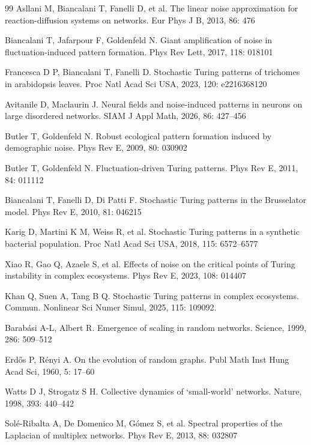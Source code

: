 \documentclass{SCIS2026}
\begin{document}
\begin{thebibliography}{99}
	Asllani M, Biancalani T, Fanelli D, et al. The linear noise approximation for reaction-diffusion systems on networks. Eur Phys J B, 2013, 86: 476

	Biancalani T, Jafarpour F, Goldenfeld N. Giant amplification of noise in fluctuation-induced pattern formation. Phys Rev Lett, 2017, 118: 018101

	Francesca D P, Biancalani T, Fanelli D. Stochastic Turing patterns of trichomes in arabidopsis leaves. Proc Natl Acad Sci USA, 2023, 120: e2216368120

	Avitanile D, Maclaurin J. Neural fields and noise-induced patterns in neurons on large disordered networks. SIAM J Appl Math, 2026, 86: 427--456

	Butler T, Goldenfeld N. Robust ecological pattern formation induced by demographic noise. Phys Rev E, 2009, 80: 030902

	Butler T, Goldenfeld N. Fluctuation-driven Turing patterns. Phys Rev E, 2011, 84: 011112

	Biancalani T, Fanelli D, Di Patti F. Stochastic Turing patterns in the Brusselator model. Phys Rev E, 2010, 81: 046215

	Karig D, Martini K M, Weiss R, et al. Stochastic Turing patterns in a synthetic bacterial population. Proc Natl Acad Sci USA, 2018, 115: 6572--6577

	Xiao R, Gao Q, Azaele S, et al. Effects of noise on the critical points of Turing instability in complex ecosystems. Phys Rev E, 2023, 108: 014407

	Khan Q, Suen A, Tang B Q. Stochastic Turing patterns in complex ecosystems. Commun. Nonlinear Sci Numer Simul, 2025, 115: 109092.

	Barab\'asi A-L, Albert R. Emergence of scaling in random networks. Science, 1999, 286: 509--512

	Erd\H{o}s P, R\'enyi A. On the evolution of random graphs. Publ Math Inst Hung Acad Sci, 1960, 5: 17--60

	Watts D J, Strogatz S H. Collective dynamics of `small-world' networks. Nature, 1998, 393: 440--442

	Sol\'e-Ribalta A, De Domenico M, G\'omez S, et al. Spectral properties of the Laplacian of multiplex networks. Phys Rev E, 2013, 88: 032807

\end{thebibliography}
\end{document}
